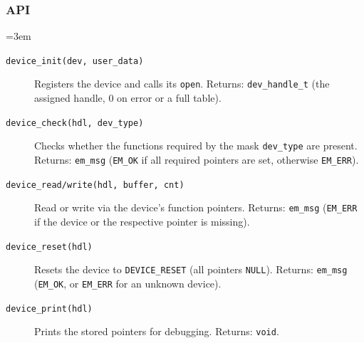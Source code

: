 \subsubsection*{API}
{\sloppy\emergencystretch=3em
\begin{description}
\item[\texttt{device\_init(dev, user\_data)}] Registers the device and calls
  its \verb|open|. Returns: \verb|dev_handle_t| (the assigned handle, $0$ on
  error or a full table).
\item[\texttt{device\_check(hdl, dev\_type)}] Checks whether the functions
  required by the mask \verb|dev_type| are present. Returns: \verb|em_msg|
  (\verb|EM_OK| if all required pointers are set, otherwise \verb|EM_ERR|).
\item[\texttt{device\_read/write(hdl, buffer, cnt)}] Read or write via the
  device's function pointers. Returns: \verb|em_msg| (\verb|EM_ERR| if the
  device or the respective pointer is missing).
\item[\texttt{device\_reset(hdl)}] Resets the device to \verb|DEVICE_RESET|
  (all pointers \verb|NULL|). Returns: \verb|em_msg| (\verb|EM_OK|, or
  \verb|EM_ERR| for an unknown device).
\item[\texttt{device\_print(hdl)}] Prints the stored pointers for debugging.
  Returns: \verb|void|.
\end{description}
\par}
